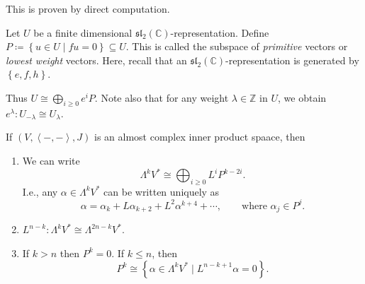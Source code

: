 This is proven by direct computation.

\begin{definition}\label{dfn:5.0.9}
	Let $U$ be a finite dimensional $\mathfrak{sl} _2(\mathbb{C} )$-representation. Define $P\coloneqq \left\{ u\in U\mid fu=0 \right\} \subseteq U$. This is called the subspace of \emph{primitive} vectors or \emph{lowest weight} vectors. Here, recall that an $\mathfrak{sl} _2(\mathbb{C} )$-representation is generated by $\left\{ e,f,h \right\} $.
\end{definition}

Thus $U \cong \bigoplus_{i\geq 0} e^iP$. Note also that for any weight $\lambda \in\mathbb{Z} $ in $U$, we obtain $e^\lambda : U_{-\lambda } \cong U_\lambda $.


\begin{theorem}\label{thm:5.0.10}
	If $(V,\left\langle -,- \right\rangle ,J)$ is an almost complex inner product spaace, then
	\begin{enumerate}
		\item We can write
			\[
				\Lambda ^kV^* \cong \bigoplus_{i\geq 0} L^iP^{k-2i} 
			.\]
			I.e., any $\alpha \in \Lambda ^kV^*$ can be written uniquely as
			\[
				\alpha =\alpha _k + L\alpha _{k+2} + L^2\alpha ^{k+4} +\cdots,\qquad \text{where } \alpha _j\in P^j
			.\]
		\item $L^{n-k} : \Lambda ^kV^* \cong \Lambda ^{2n-k} V^*$.
		\item If $k>n$ then $P^k=0$. If $k\leq n$, then
			\[
				P^k \cong  \left\{ \alpha \in \Lambda ^kV^*\mid L^{n-k+1} \alpha =0 \right\} 
			.\]
	\end{enumerate}
\end{theorem}

